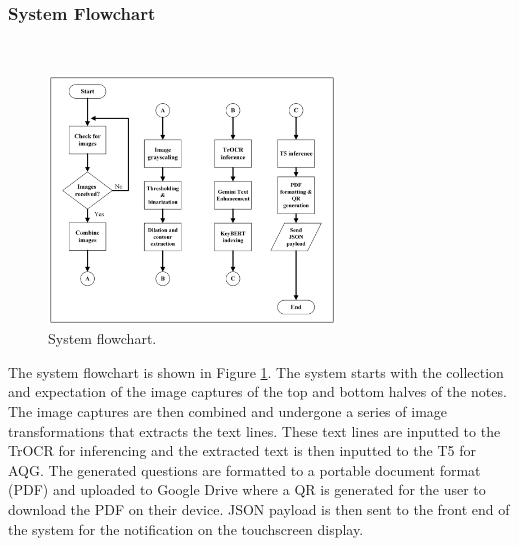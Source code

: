 \documentclass[conference]{IEEEtran}
\begin{document}
        \subsubsection{System Flowchart}
            \hfill \\
            \begin{figure}[H]
                \centerline{\includegraphics[width=3in]{flowchart.png}}
                \vspace{-0.4cm}
                \caption{System flowchart.} 
                \label{flowchart}
            \end{figure}
            \indent The system flowchart is shown in 
           Figure \ref{flowchart}. The system 
           starts with the collection and expectation of 
           the image captures of the top and bottom halves 
           of the notes. The image captures are then
           combined and undergone a series of image 
           transformations that extracts the text lines. 
           These text lines are inputted to the TrOCR for 
           inferencing and the extracted text is then
           inputted to the T5 for AQG. The generated
           questions are formatted to a portable document
              format (PDF) and uploaded to Google Drive 
            where a QR is generated for the user to download 
            the PDF on their device. JSON payload is then sent 
            to the front end of the system for the 
            notification on the touchscreen display.
        \vspace{0.4cm}
\end{document}

